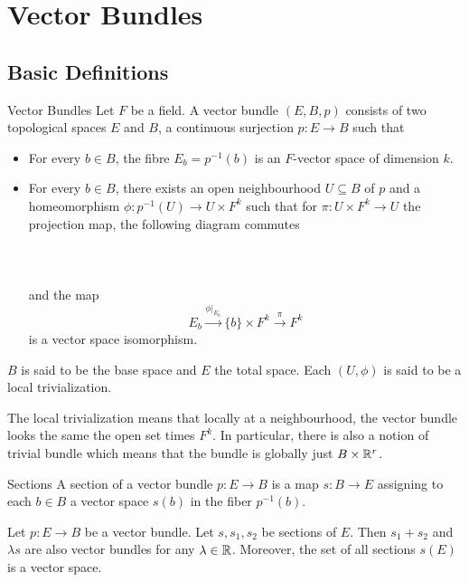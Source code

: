 \documentclass[a4paper]{article}
\begin{document}
\pagebreak

\section{Vector Bundles}
\subsection{Basic Definitions}
\begin{defn}{Vector Bundles}{} Let $F$ be a field. A vector bundle $(E,B,p)$ consists of two topological spaces $E$ and $B$, a continuous surjection $p:E\to B$ such that
\begin{itemize}
\item For every $b\in B$, the fibre $E_b=p^{-1}(b)$ is an $F$-vector space of dimension $k$. 
\item For every $b\in B$, there exists an open neighbourhood $U\subseteq B$ of $p$ and a homeomorphism $\phi:p^{-1}(U)\to U\times F^k$ such that for $\pi:U\times F^k\to U$ the projection map, the following diagram commutes \\~\\
 \\~\\
and the map $$E_b\overset{\phi|_{E_b}}{\longrightarrow}\{b\}\times F^k\overset{\pi}{\longrightarrow}F^k$$ is a vector space isomorphism. 
\end{itemize}
$B$ is said to be the base space and $E$ the total space. Each $(U,\phi)$ is said to be a local trivialization. 
\end{defn}

The local trivialization means that locally at a neighbourhood, the vector bundle looks the same the open set times $F^k$. In particular, there is also a notion of trivial bundle which means that the bundle is globally just $B\times\mathbb{R}^r$. 

\begin{defn}{Sections}{} A section of a vector bundle $p:E\to B$ is a map $s:B\to E$ assigning to each $b\in B$ a vector space $s(b)$ in the fiber $p^{-1}(b)$. 
\end{defn}

\begin{prp}{}{} Let $p:E\to B$ be a vector bundle. Let $s,s_1,s_2$ be sections of $E$. Then $s_1+s_2$ and $\lambda s$ are also vector bundles for any $\lambda\in\mathbb{R}$. Moreover, the set of all sections $s(E)$ is a vector space. 
\end{prp}
\end{document}
